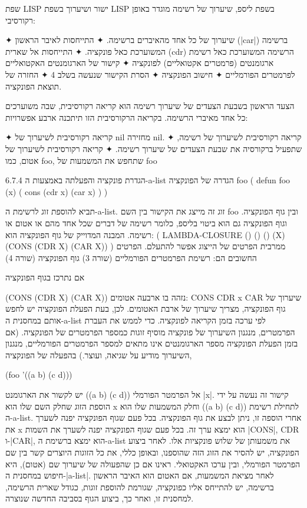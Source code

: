 שפת LISP
ישור ושיערוך בשפת LISP
בשפת ליספ, שיערוך של רשימה מוגדר באופן רקורסיבי:
\begin{enumerate}
  ✦ שיערוך של כל אחד מהאיברים ברשימה.
  ✦ התייחסות לאיבר הראשון (\E|car|) ברשימה המשוערכת כאל פונקציה.
  ✦ התייחסות אל שארית (cdr) הרשימה המשוערכת כאל רשימת ארגומנטים (פרמטרים
  אקטואליים) לפונקציה
  ✦ קישור של הארגומנטים האקטואליים לפרמטרים הפורמליים
  ✦ חישוב הפונקציה
  ✦ הסרת הקישור שנעשה בשלב 4
  ✦ החזרה של תוצאת הפונקציה.
\end{enumerate}
הצעד הראשון בשבעת הצעדים של שיערוך רשימה הוא קריאה רקורסיבית, שבה משוערכים כל
אחד מאיברי הרשימה. בקריאה הרקורסיבית הזו תיתכנה ארבע אפשרויות:
\begin{enumerate}
  ✦
  קריאה רקורסיבית
  לשיערוך של nil מחזירה nil.
  ✦ קריאה רקורסיבית לשיערוך של רשימה, שתפעיל ברקורסיה את שבעת הצעדים של שיערוך רשימה.
  ✦ קריאה רקורסיבית לשיערוך של אטום, כמו foo, שתחפש את המשמעות של foo
\end{enumerate}

​6.7.4​ הגדרת פונקציה והפעלתה באמצעות ה-a-list
הגדרה של הפונקציה foo
(
defun
foo (x)
(
cons (cdr x) (car x)
)
)

תביא להוספת זוג לרשימת ה-a-list. זוג זה מייצג את הקישור בין השם foo ובין גוף
הפונקציה. וגוף הפונקציה גם הוא ביטוי בליספ, כלומר רשימה של דברים שכל אחד מהם או
אטום או רשימה.  המבנה המדוייק של גוף הפונקציה הוא:
(
LAMBDA-CLOSURE () () ()
(X)
(CONS (CDR X) (CAR X))
)
ממרבית הפרטים של הייצוג אפשר להתעלם. הפרטים החשובים הם:
רשימת הפרמטרים הפורמליים (שורה 3)
גוף הפונקציה (שורה 4)

אם נתרכז בגוף הפונקציה

(CONS (CDR X) (CAR X))
נזהה בו ארבעה אטומים:
CONS
CDR
x
CAR
שיערוך של גוף הפונקציה, מצריך שיערוך של ארבת האטומים. לכן, בעת הפעלת הפונקציה
יש לחפש אותם במחסנית ה-a-list לפי ערכה בזמן הקריאה לפונקציה. כדי לממש את העברת
הפרמטרים, מנגנון השיערוך של פונקציה מוסיף זוגות כמספר הפרמטרים של הפונקציה. (אם
בזמן הפעלת הפונקציה מספר הארגומנטים אינו מתאים למספר הפרמטרים הפורמליים, מנגנון
השיערוך מודיע על שגיאה, ועוצר.) בהפעלה של הפונקציה,
\begin{english}
(foo '((a b) (c d)))
\end{english}
יש לקשור את הארגומנט ((a b) (c d)) אל הפרמטר הפורמלי \E|x|. קישור זה נעשה על
ידי הוספת הזוג שחלק השם שלו הוא x וחלק המשמעות שלו הוא ((a b) (c d)) לתחילת
רשימת
ה-a-list. אחרי הוספה זו, ניתן לבצע את גוף הפונקציה. בכל פעם שגוף הפונקציה יפנה
לשערך את x הוא ימצא ערך זה. בכל פעם שגוף הפונקציה יפנה לשערך את השמות \E|CONS|,
CDR ו-\E|CAR|, הוא ימצא ברשימת ה-a-list את משמעותן של שלוש פונקציות אלו. לאחר
ביצוע
הפונקציה, יש להסיר את הזוג הזה שהוספנו, ובאופן כללי, את כל הזוגות היוצרים קשר
בין שם הפרמטר הפורמלי, ובין ערכו האקטואלי.  ראינו אם כן שהפעולה של שיערוך שם
(אטום), היא חיפוש במחסנית ה-\E|a-list|. לאחר מציאת המשמעות, אם האטום הוא האיבר
הראשון ברשימה, יש להתייחס אליו כפונקציה, שגורמת להוספת זוגות, כגודל שארית
הרשימה, למחסנית זו, ואחר כך, ביצוע הגוף בסביבה החדשה שנוצרה.

